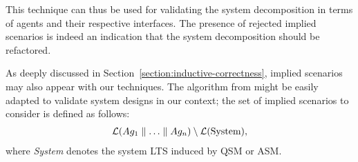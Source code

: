 This technique can thus be used for validating the system decomposition in terms of agents and their respective interfaces. The presence of rejected implied scenarios is indeed an indication that the system decomposition should be refactored.

As deeply discussed in Section~\ref{section:inductive-correctness}, implied scenarios may also appear with our techniques. The algorithm from \cite{Uchitel:2004} might be easily adapted to validate system designs in our context; the set of implied scenarios to consider is defined as follows:
\begin{align*}
\mathcal{L}(Ag_1 \parallel \ldots \parallel Ag_n) \setminus \mathcal{L}(\mbox{System}),
\end{align*}
where \emph{System} denotes the system LTS induced by QSM or ASM.






